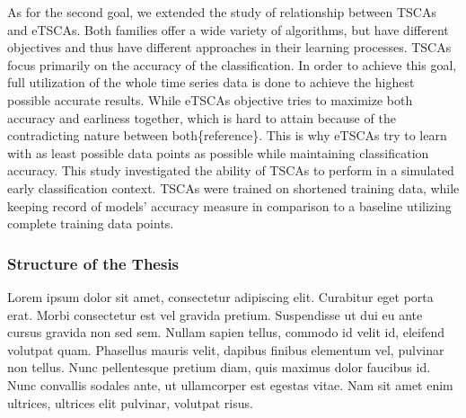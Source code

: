 As for the second goal, we extended the study of relationship between TSCAs and eTSCAs.
Both families offer a wide variety of algorithms, but have different objectives and thus have different approaches in their learning processes.
TSCAs focus primarily on the accuracy of the classification. In order to achieve this goal, full utilization of the whole time series data is done to achieve the highest possible accurate results.
While eTSCAs objective tries to maximize both accuracy and earliness together, which is hard to attain because of the contradicting nature between both\{reference\}.
This is why eTSCAs try to learn with as least possible data points as possible while maintaining classification accuracy.
This study investigated the ability of TSCAs to perform in a simulated early classification context.
TSCAs were trained on shortened training data, while keeping record of models' accuracy measure in comparison to a baseline utilizing complete training data points.

\subsubsection*{Structure of the Thesis}
\label{thesisStructure}
Lorem ipsum dolor sit amet, consectetur adipiscing elit. Curabitur eget porta erat. Morbi consectetur est vel gravida pretium. Suspendisse ut dui eu ante cursus gravida non sed sem. Nullam sapien tellus, commodo id velit id, eleifend volutpat quam. Phasellus mauris velit, dapibus finibus elementum vel, pulvinar non tellus. Nunc pellentesque pretium diam, quis maximus dolor faucibus id. Nunc convallis sodales ante, ut ullamcorper est egestas vitae. Nam sit amet enim ultrices, ultrices elit pulvinar, volutpat risus.